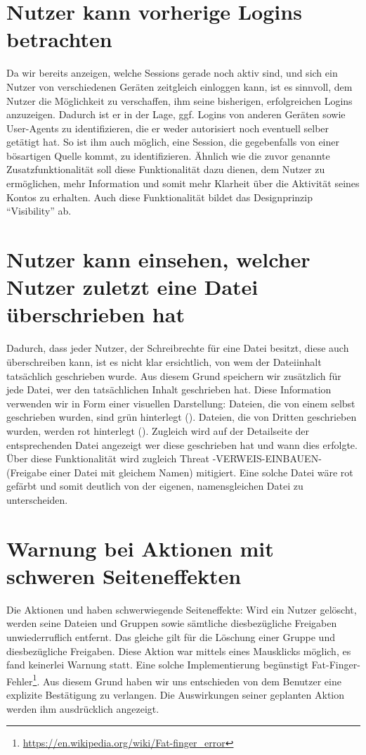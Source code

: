 \documentclass[12pt,DIV14,BCOR10mm,a4paper,parskip=half-,headsepline,headinclude,english,ngerman,bibliography=totocnumbered]{scrreprt}
\begin{document}
\section{Nutzer kann vorherige Logins betrachten}

Da wir bereits anzeigen, welche Sessions gerade noch aktiv sind, und sich ein Nutzer von verschiedenen Geräten zeitgleich einloggen kann, ist es sinnvoll, dem Nutzer die Möglichkeit zu verschaffen, ihm seine bisherigen, erfolgreichen Logins anzuzeigen.
Dadurch ist er in der Lage, ggf. Logins von anderen Geräten sowie User-Agents zu identifizieren, die er weder autorisiert noch eventuell selber getätigt hat.
So ist ihm auch möglich, eine Session, die gegebenfalls von einer bösartigen Quelle kommt, zu identifizieren.
Ähnlich wie die zuvor genannte Zusatzfunktionalität soll diese Funktionalität dazu dienen, dem Nutzer zu ermöglichen, mehr Information und somit mehr Klarheit über die Aktivität seines Kontos zu erhalten.
Auch diese Funktionalität bildet das Designprinzip \enquote{Visibility} ab.

\section{Nutzer kann einsehen, welcher Nutzer zuletzt eine Datei überschrieben hat}
Dadurch, dass jeder Nutzer, der Schreibrechte für eine Datei besitzt, diese auch überschreiben kann, ist es nicht klar ersichtlich, von wem der Dateiinhalt tatsächlich geschrieben wurde. Aus diesem Grund speichern wir zusätzlich für jede Datei, wer den tatsächlichen Inhalt geschrieben hat. Diese Information verwenden wir in Form einer visuellen Darstellung: Dateien, die von einem selbst geschrieben wurden, sind grün hinterlegt (). Dateien, die von Dritten geschrieben wurden, werden rot hinterlegt (). Zugleich wird auf der Detailseite der entsprechenden Datei angezeigt wer diese geschrieben hat und wann dies erfolgte.
Über diese Funktionalität wird zugleich Threat -VERWEIS-EINBAUEN- (Freigabe einer Datei mit gleichem Namen) mitigiert. Eine solche Datei wäre rot gefärbt und somit deutlich von der eigenen, namensgleichen Datei zu unterscheiden.

\section{Warnung bei Aktionen mit schweren Seiteneffekten}
\label{warning:severe:sideeffects}
Die Aktionen  und  haben schwerwiegende Seiteneffekte: Wird ein Nutzer gelöscht, werden seine Dateien und Gruppen sowie sämtliche diesbezügliche Freigaben unwiederruflich entfernt. Das gleiche gilt für die Löschung einer Gruppe und diesbezügliche Freigaben. Diese Aktion war mittels eines Mausklicks möglich, es fand keinerlei Warnung statt. Eine solche Implementierung begünstigt Fat-Finger-Fehler\footnote{\url{https://en.wikipedia.org/wiki/Fat-finger_error}}. Aus diesem Grund haben wir uns entschieden von dem Benutzer eine explizite Bestätigung zu verlangen. Die Auswirkungen seiner geplanten Aktion werden ihm ausdrücklich angezeigt.
\end{document}
